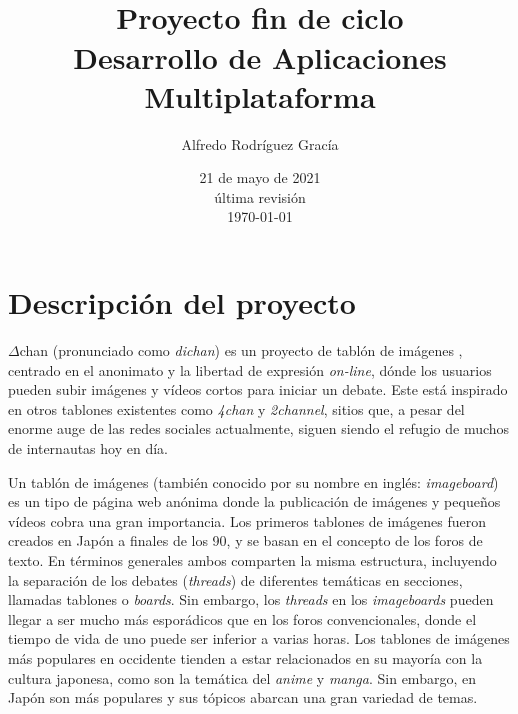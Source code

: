 \documentclass[12pt,a4paper,titlepage]{article}
\title{\Dchan\\\bigskip\normalsize{Proyecto fin de ciclo\\Desarrollo de Aplicaciones Multiplataforma}}
\author{Alfredo Rodríguez Gracía}
\date{21 de mayo de 2021\\\bigskip\scriptsize{última revisión\\\today}}
\newcommand\Dchan{$\Delta$chan }
\begin{document}
    \maketitle
    \tableofcontents
    \newpage

    \section{Descripción del proyecto}




    \Dchan (pronunciado como \textit{dichan}) es un proyecto de tablón de imágenes \cite{wikiImageboard}, centrado en el anonimato y la libertad de expresión \textit{on-line}, dónde los usuarios pueden subir imágenes y vídeos cortos para iniciar un debate. Este está inspirado en otros tablones existentes como \emph{4chan} y \emph{2channel}, sitios que, a pesar del enorme auge de las redes sociales actualmente, siguen siendo el refugio de muchos de internautas hoy en día.

    Un tablón de imágenes (también conocido por su nombre en inglés: \textit{imageboard}) es un tipo de página web anónima donde la publicación de imágenes y pequeños vídeos cobra una gran importancia. Los primeros tablones de imágenes fueron creados en Japón a finales de los 90, y se basan en el concepto de los foros de texto. En términos generales ambos comparten la misma estructura, incluyendo la separación de los debates (\textit{threads}) de diferentes temáticas en secciones, llamadas tablones o \textit{boards}. Sin embargo, los \textit{threads} en los \textit{imageboards} pueden llegar a ser mucho más esporádicos que en los foros convencionales, donde el tiempo de vida de uno puede ser inferior a varias horas. Los tablones de imágenes más populares en occidente tienden a estar relacionados en su mayoría con la cultura japonesa, como son la temática del \emph{anime} y \emph{manga}. Sin embargo, en Japón son más populares y sus tópicos abarcan una gran variedad de temas.
\end{document}
